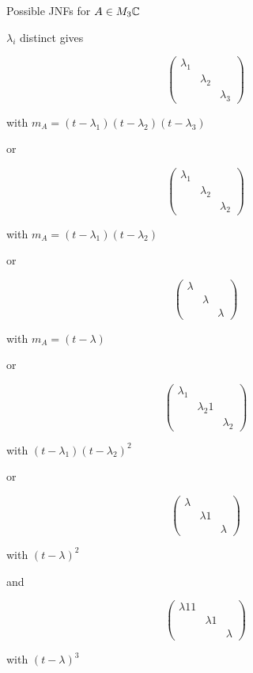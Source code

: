 \documentclass[a4paper]{article}
\begin{document}
\begin{eg}
	Possible JNFs for $ A \in M_{3} \mathbb{C} $
	
	$ \lambda_{i} $ distinct gives
	
	\[ \begin{pmatrix}
	\lambda_{1} & & \\
	& \lambda_{2} & \\
	& & \lambda_{3}
	\end{pmatrix} \]
	
	with $ m_{A} = (t - \lambda_{1}) (t - \lambda_{2}) (t - \lambda_{3}) $
	
	
	or
	
	\[ \begin{pmatrix}
	\lambda_{1} & & \\
	& \lambda_{2} & \\
	& & \lambda_{2}
	\end{pmatrix} \]
	
	with $ m_{A} =  (t - \lambda_{1})(t - \lambda_{2})  $
	
	or 
	
		
	\[ \begin{pmatrix}
	\lambda & & \\
	& \lambda & \\
	& & \lambda
	\end{pmatrix} \]
	
	with $ m_{A} = (t - \lambda) $
	
	or 
	
		\[ \begin{pmatrix}
	\lambda_{1} & & \\
	& \lambda_{2} 1 \\
	& & \lambda_{2}
	\end{pmatrix} \]
	
	with $ (t - \lambda_{1})(t - \lambda_{2})^{2} $
	
	or 
	
	\[ \begin{pmatrix}
	\lambda & & \\
	& \lambda 1 \\
	& & \lambda
	\end{pmatrix} \]
	
	with $ (t - \lambda)^{2} $
	
	and 
	
	\[ \begin{pmatrix}
	\lambda 1 1 \\
	& \lambda 1 \\
	& & \lambda
	\end{pmatrix} \]
	
	with $ (t - \lambda )^{3} $
	
\end{eg}
\end{document}
